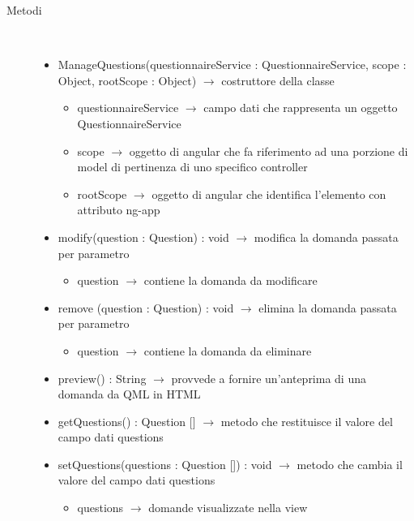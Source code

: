 \begin{description}
\item[Metodi] \hfill \\
\vspace{-7mm}
\begin{itemize}
	\item ManageQuestions(questionnaireService : QuestionnaireService, scope : Object, rootScope : Object) $\rightarrow$ costruttore della classe\begin{itemize}
		\item questionnaireService $\rightarrow$ campo dati che rappresenta un oggetto QuestionnaireService
		\item scope $\rightarrow$ oggetto di angular che fa riferimento ad una porzione di model di pertinenza di uno specifico controller
		\item rootScope $\rightarrow$ oggetto di angular che identifica l’elemento con attributo ng-app
	\end{itemize}
	
	\item modify(question : Question) : void $\rightarrow$ modifica la domanda passata per parametro\begin{itemize}
		\item question $\rightarrow$ contiene  la domanda da modificare 
	\end{itemize}
	
	\item remove (question : Question) : void $\rightarrow$ elimina la domanda passata per parametro\begin{itemize}
		\item question $\rightarrow$ contiene la domanda da eliminare 
	\end{itemize}
	
	\item preview() : String $\rightarrow$ provvede a fornire un'anteprima di una domanda da QML in HTML
	\item getQuestions() : Question [] $\rightarrow$ metodo che restituisce il valore del campo dati questions
	\item setQuestions(questions : Question []) : void $\rightarrow$ metodo che cambia il valore del campo dati questions\begin{itemize}
		\item questions $\rightarrow$ domande visualizzate nella view
	\end{itemize}
	
\end{itemize}

\end{description}

